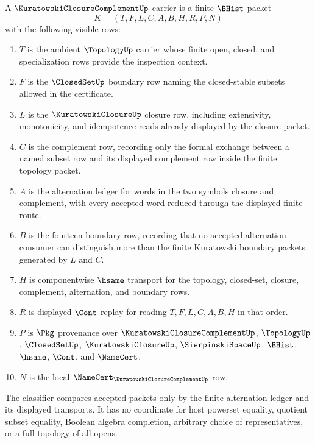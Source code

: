 \begin{definition}
\label{def:kuratowski-closure-complement-carrier}
A $\KuratowskiClosureComplementUp$ carrier is a finite $\BHist$ packet
$$
K=(T,F,L,C,A,B,H,R,P,N)
$$
with the following visible rows:
\begin{enumerate}
\item $T$ is the ambient $\TopologyUp$ carrier whose finite open, closed, and specialization rows provide the inspection context.
\item $F$ is the $\ClosedSetUp$ boundary row naming the closed-stable subsets allowed in the certificate.
\item $L$ is the $\KuratowskiClosureUp$ closure row, including extensivity, monotonicity, and idempotence reads already displayed by the closure packet.
\item $C$ is the complement row, recording only the formal exchange between a named subset row and its displayed complement row inside the finite topology packet.
\item $A$ is the alternation ledger for words in the two symbols closure and complement, with every accepted word reduced through the displayed finite route.
\item $B$ is the fourteen-boundary row, recording that no accepted alternation consumer can distinguish more than the finite Kuratowski boundary packets generated by $L$ and $C$.
\item $H$ is componentwise $\hsame$ transport for the topology, closed-set, closure, complement, alternation, and boundary rows.
\item $R$ is displayed $\Cont$ replay for reading $T,F,L,C,A,B,H$ in that order.
\item $P$ is $\Pkg$ provenance over $\KuratowskiClosureComplementUp$, $\TopologyUp$, $\ClosedSetUp$, $\KuratowskiClosureUp$, $\SierpinskiSpaceUp$, $\BHist$, $\hsame$, $\Cont$, and $\NameCert$.
\item $N$ is the local $\NameCert_{\KuratowskiClosureComplementUp}$ row.
\end{enumerate}
The classifier compares accepted packets only by the finite alternation ledger and its displayed transports. It has no coordinate for host powerset equality, quotient subset equality, Boolean algebra completion, arbitrary choice of representatives, or a full topology of all opens.
\end{definition}


